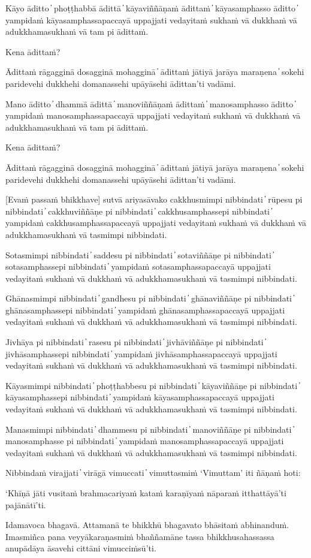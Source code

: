 Kāyo āditto  ̓  phoṭṭhabbā ādittā  ̓  kāyaviññāṇaṁ ādittaṁ  ̓  kāyasamphasso āditto  ̓  yampidaṁ kāyasamphassapaccayā uppajjati vedayitaṁ sukhaṁ vā dukkhaṁ vā adukkhamasukhaṁ vā tam pi ādittaṁ.

Kena ādittaṁ?

Ādittaṁ rāgagginā dosagginā mohagginā  ̓  ādittaṁ jātiyā jarāya maraṇena  ̓  sokehi paridevehi dukkhehi domanassehi upāyāsehi ādittan’ti vadāmi.

Mano āditto  ̓  dhammā ādittā  ̓  manoviññāṇaṁ ādittaṁ  ̓  manosamphasso āditto  ̓  yampidaṁ manosamphassapaccayā uppajjati vedayitaṁ sukhaṁ vā dukkhaṁ vā adukkhamasukhaṁ vā tam pi ādittaṁ.

Kena ādittaṁ?

Ādittaṁ rāgagginā dosagginā mohagginā  ̓  ādittaṁ jātiyā jarāya maraṇena  ̓  sokehi paridevehi dukkhehi domanassehi upāyāsehi ādittan’ti vadāmi.

[Evaṁ passaṁ bhikkhave] sutvā ariyasāvako cakkhusmimpi nibbindati  ̓  rūpesu pi nibbindati  ̓  cakkhuviññāṇe pi nibbindati  ̓  cakkhusamphassepi nibbindati  ̓  yampidaṁ cakkhusamphassapaccayā uppajjati vedayitaṁ sukhaṁ vā dukkhaṁ vā adukkhamasukhaṁ vā tasmimpi nibbindati.

Sotasmimpi nibbindati  ̓  saddesu pi nibbindati  ̓  sotaviññāṇe pi nibbindati  ̓  sotasamphassepi nibbindati  ̓  yampidaṁ sotasamphassapaccayā uppajjati vedayitaṁ sukhaṁ vā dukkhaṁ vā adukkhamasukhaṁ vā tasmimpi nibbindati.

Ghānasmimpi nibbindati  ̓  gandhesu pi nibbindati  ̓  ghānaviññāṇe pi nibbindati  ̓  ghānasamphassepi nibbindati  ̓  yampidaṁ ghānasamphassapaccayā uppajjati vedayitaṁ sukhaṁ vā dukkhaṁ vā adukkhamasukhaṁ vā tasmimpi nibbindati.

Jivhāya pi nibbindati  ̓  rasesu pi nibbindati  ̓  jivhāviññāṇe pi nibbindati  ̓  jivhāsamphassepi nibbindati  ̓  yampidaṁ jivhāsamphassapaccayā uppajjati vedayitaṁ sukhaṁ vā dukkhaṁ vā adukkhamasukhaṁ vā tasmimpi nibbindati.

Kāyasmimpi nibbindati  ̓  phoṭṭhabbesu pi nibbindati  ̓  kāyaviññāṇe pi nibbindati  ̓  kāyasamphassepi nibbindati  ̓  yampidaṁ kāyasamphassapaccayā uppajjati vedayitaṁ sukhaṁ vā dukkhaṁ vā adukkhamasukhaṁ vā tasmimpi nibbindati.

Manasmimpi nibbindati  ̓  dhammesu pi nibbindati  ̓  manoviññāṇe pi nibbindati  ̓  manosamphasse pi nibbindati  ̓  yampidaṁ manosamphassapaccayā uppajjati vedayitaṁ sukhaṁ vā dukkhaṁ vā adukkhamasukhaṁ vā tasmimpi nibbindati.

Nibbindaṁ virajjati  ̓  virāgā vimuccati  ̓  vimuttasmiṁ ‘Vimuttam’ iti ñāṇaṁ hoti:

‘Khīṇā jāti vusitaṁ brahmacariyaṁ kataṁ karaṇīyaṁ nāparaṁ itthattāyā’ti pajānātī’ti.

Idamavoca bhagavā. Attamanā te bhikkhū bhagavato bhāsitaṁ abhinanduṁ. Imasmiñca pana veyyākaraṇasmiṁ bhaññamāne tassa bhikkhusahassassa anupādāya āsavehi cittāni vimucciṁsū’ti.

